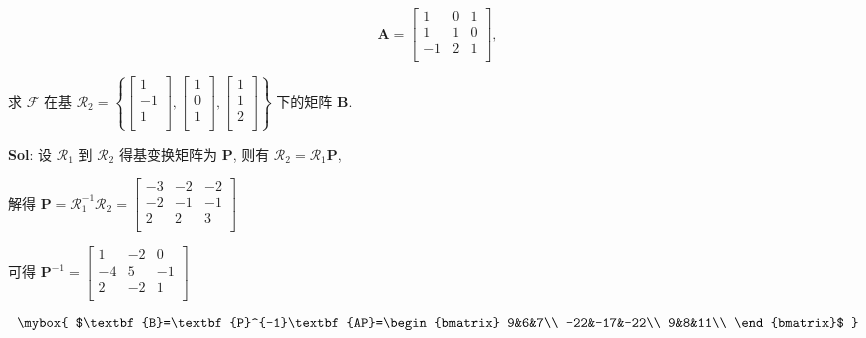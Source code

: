 $$
\textbf{A}=\begin{bmatrix}
    1&0&1\\
    1&1&0\\
    -1&2&1\\
\end{bmatrix},
$$

\vspace{30pt}

求 $\mathscr{F}$ 在基 $\mathscr{R}_2=\left\{
    \begin{bmatrix}
        1\\-1\\1\\
    \end{bmatrix},
    \begin{bmatrix}
        1\\0\\1\\
    \end{bmatrix},
    \begin{bmatrix}
        1\\1\\2\\
    \end{bmatrix}
\right\}
$ 下的矩阵 $\textbf{B}$.

\textbf{Sol}:  设 $\mathscr{R}_1$ 到 $\mathscr{R}_2$ 得基变换矩阵为 $\textbf{P}$, 则有 $\mathscr{R}_2=\mathscr{R}_1\textbf{P}$,

解得 $\textbf{P}=\mathscr{R}_1^{-1}\mathscr{R}_2=\begin{bmatrix}
    -3&-2&-2\\
    -2&-1&-1\\
    2&2&3\\
\end{bmatrix}$

可得 $\textbf{P}^{-1}=\begin{bmatrix}
    1&-2&0\\
    -4&5&-1\\
    2&-2&1\\
\end{bmatrix}$

$$
\mybox{
$\textbf{B}=\textbf{P}^{-1}\textbf{AP}=\begin{bmatrix}
    9&6&7\\
    -22&-17&-22\\
    9&8&11\\
\end{bmatrix}$
}
$$


\vspace{12pt}




